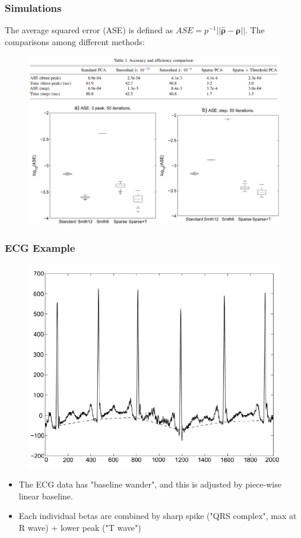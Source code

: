 \documentclass{beamer}
\begin{document}
	\begin{frame}
		\frametitle{Simulations}
	The average squared error (ASE) is defined as $ASE = p^{-1}||\hat{\bm{\rho}} - \bm{\rho}||$. The comparisons among different methods:
	\begin{figure}
		\includegraphics[width=0.9\linewidth]{image011.png}
		\includegraphics[width=0.8\linewidth]{image012.png}
	\end{figure}
	\end{frame}

	\begin{frame}
		\frametitle{ECG Example}
		\begin{figure}
			\includegraphics[width=0.5\linewidth]{image013.png}
		\end{figure}
		\begin{itemize}
			\item 
			The ECG data has "baseline wander", and this is adjusted by piece-wise linear baseline.
			\item
			Each individual betas are combined by sharp spike ("QRS complex", max at R wave) + lower peak ("T wave")
		\end{itemize}
		
	\end{frame}
\end{document}
